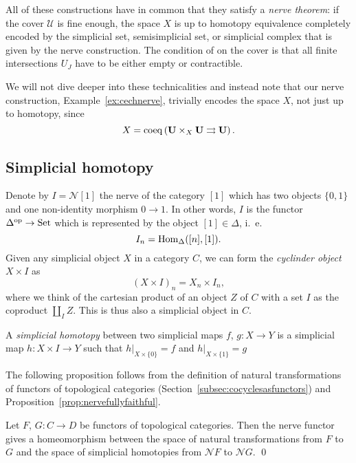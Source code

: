 \documentclass[a4paper,openany]{scrbook}
\newcommand{\nerve}{\mathcal N}
\begin{document}
All of these constructions have in common that they satisfy a \emph{nerve theorem}: if the cover $\mathcal U$ is fine enough, the space $X$ is up to homotopy equivalence completely encoded by the simplicial set, semisimplicial set, or simplicial complex that is given by the nerve construction. The condition of on the cover is that all finite intersections $U_J$ have to be either empty or contractible.

We will not dive deeper into these technicalities and instead note that our nerve construction, Example~\ref{ex:cechnerve}, trivially encodes the space $X$, not just up to homotopy, since
\[
X = \operatorname{coeq} \left( \mathbf U \times_X \mathbf U \rightrightarrows \mathbf U\right).
\]

\subsection{Simplicial homotopy}\label{subsec:simplicial-homotopy}

Denote by $I=\nerve [1]$ the nerve of the category $[1]$ which has two objects $\{0,1\}$ and one non-identity morphism $0 \to 1$. In other words, $I$ is the functor $\Delta^{\operatorname{op}}\to\operatorname{Set}$ which is represented by the object $[1] \in \Delta$, i.~e.
\[
I_n = \operatorname{Hom}_{\Delta}([n],[1]).
\]
Given any simplicial object $X$ in a category $C$, we can form the \emph{cyclinder object} $X \times I$ as
\[
(X \times I)_n = X_n \times I_n,
\]
where we think of the cartesian product of an object $Z$ of $C$ with a set $I$ as the coproduct $\coprod_I Z$. This is thus also a simplicial object in $C$.

\begin{defn}
A \emph{simplicial homotopy} between two simplicial maps $f$, $g\colon X \to Y$ is a simplicial map $h\colon X \times I \to Y$ such that $h|_{X \times \{0\}} = f$ and $h|_{X \times \{1\}} = g$
\end{defn}

The following proposition follows from the definition of natural transformations of functors of topological categories (Section~\ref{subsec:cocyclesasfunctors}) and Proposition~\ref{prop:nervefullyfaithful}.

\begin{prop}
Let $F$, $G\colon C \to D$ be functors of topological categories. Then the nerve functor gives a homeomorphism between the space of natural transformations from $F$ to $G$ and the space of simplicial homotopies from $\nerve F$ to $\nerve G$. \qed
\end{prop}
\end{document}
